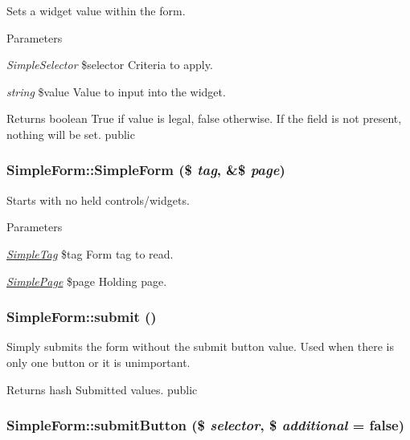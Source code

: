 \label{class_simple_form_ac4452215cf2bc28e2e5a06e1813162cd}
Sets a widget value within the form. 
\begin{DoxyParams}{Parameters}
\item[{\em SimpleSelector}]\$selector Criteria to apply. \item[{\em string}]\$value Value to input into the widget. \end{DoxyParams}
\begin{DoxyReturn}{Returns}
boolean True if value is legal, false otherwise. If the field is not present, nothing will be set.  public 
\end{DoxyReturn}
\hypertarget{class_simple_form_a0b5b14841ca19db91ace02f8015da52f}{
\subsubsection[{SimpleForm}]{\setlength{\rightskip}{0pt plus 5cm}SimpleForm::SimpleForm (\$ {\em tag}, \/  \&\$ {\em page})}}
\label{class_simple_form_a0b5b14841ca19db91ace02f8015da52f}
Starts with no held controls/widgets. 
\begin{DoxyParams}{Parameters}
\item[{\em \hyperlink{class_simple_tag}{SimpleTag}}]\$tag Form tag to read. \item[{\em \hyperlink{class_simple_page}{SimplePage}}]\$page Holding page. \end{DoxyParams}
\hypertarget{class_simple_form_a6d59ba8fe87af0d7873fbf38e36c9157}{
\subsubsection[{submit}]{\setlength{\rightskip}{0pt plus 5cm}SimpleForm::submit ()}}
\label{class_simple_form_a6d59ba8fe87af0d7873fbf38e36c9157}
Simply submits the form without the submit button value. Used when there is only one button or it is unimportant. \begin{DoxyReturn}{Returns}
hash Submitted values.  public 
\end{DoxyReturn}
\hypertarget{class_simple_form_a335273f023ff494045ab6d82072a5d9f}{
\subsubsection[{submitButton}]{\setlength{\rightskip}{0pt plus 5cm}SimpleForm::submitButton (\$ {\em selector}, \/  \$ {\em additional} = {\ttfamily false})}}
